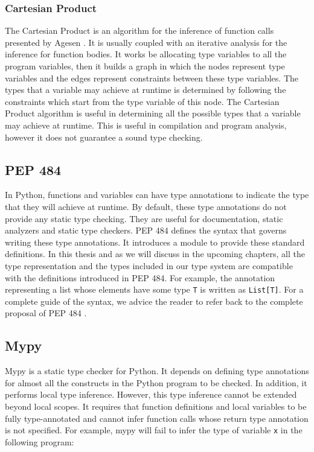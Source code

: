 \subsubsection{Cartesian Product}
The Cartesian Product is an algorithm for the inference of function calls presented by Agesen \cite{cpa}. It is usually coupled with an iterative analysis for the inference for function bodies. It works be allocating type variables to all the program variables, then it builds a graph in which the nodes represent type variables and the edges represent constraints between these type variables. The types that a variable may achieve at runtime is determined by following the constraints which start from the type variable of this node. The Cartesian Product algorithm is useful in determining all the possible types that a variable may achieve at runtime. This is useful in compilation and program analysis, however it does not guarantee a sound type checking.

\subsection{PEP 484 \cite{484}}
In Python, functions and variables can have type annotations to indicate the type that they will achieve at runtime. By default, these type annotations do not provide any static type checking. They are useful for documentation, static analyzers and static type checkers. PEP 484 defines the syntax that governs writing these type annotations. It introduces a module to provide these standard definitions. In this thesis and as we will discuss in the upcoming chapters, all the type representation and the types included in our type system are compatible with the definitions introduced in PEP 484. For example, the annotation representing a list whose elements have some type \lstinline|T| is written as \lstinline|List[T]|. For a complete guide of the syntax, we advice the reader to refer back to the complete proposal of PEP 484 \cite{484}.

\subsection{Mypy \cite{mypy}}
Mypy is a static type checker for Python. It depends on defining type annotations for almost all the constructs in the Python program to be checked. In addition, it performs local type inference. However, this type inference cannot be extended beyond local scopes. It requires that function definitions and local variables to be fully type-annotated and cannot infer function calls whose return type annotation is not specified. For example, mypy will fail to infer the type of variable \lstinline|x| in the following program:

